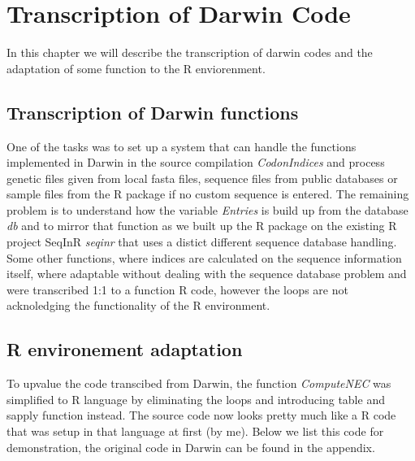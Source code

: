 \chapter{Transcription of Darwin Code}
In this chapter we will describe the transcription of darwin codes and the adaptation of some function to the R enviorenment.


\section{Transcription of Darwin functions}
One of the tasks was to set up a system that can handle the functions implemented in Darwin in the source compilation \textit{CodonIndices} and process genetic files given from local fasta files, sequence files from public databases or sample files from the R package if no custom sequence is entered. The remaining problem is to understand how the variable \textit{Entries} is build up from the database \textit{db} and to mirror that function as we built up the R package on the existing R project SeqInR \textit{seqinr} that uses a distict different sequence database handling.
Some other functions, where indices are calculated on the sequence information itself, where adaptable without dealing with the sequence database problem and were transcribed 1:1 to a function R code, however the loops are not acknoledging the functionality of the R environment.

\section{R environement adaptation}
To upvalue the code transcibed from Darwin, the function \textit{ComputeNEC} was simplified to R language by eliminating the loops and introducing table and sapply function instead. The source code now looks pretty much like a R code that was setup in that language at first (by me). Below we list this code for demonstration, the original code in Darwin can be found in the appendix.

  